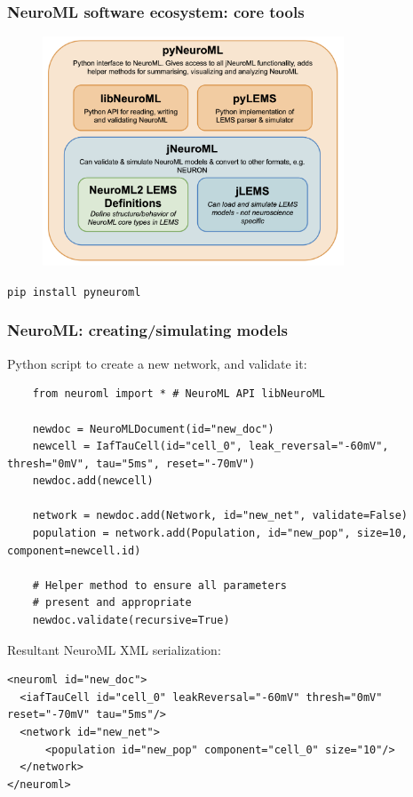 \begin{frame}[c]
  \frametitle{NeuroML software ecosystem: core tools}
  \begin{figure}[h]
    \centering
    \includegraphics[width=0.8\textwidth]{99_images/software.png}
  \end{figure}
  \begin{center}
    \texttt{pip install pyneuroml}
  \end{center}
\end{frame}
\begin{frame}[fragile,c]
  \frametitle{NeuroML: creating/simulating models}
  Python script to create a new network, and validate it:
    \begin{verbatim}
    from neuroml import * # NeuroML API libNeuroML

    newdoc = NeuroMLDocument(id="new_doc")
    newcell = IafTauCell(id="cell_0", leak_reversal="-60mV", thresh="0mV", tau="5ms", reset="-70mV")
    newdoc.add(newcell)

    network = newdoc.add(Network, id="new_net", validate=False)
    population = network.add(Population, id="new_pop", size=10, component=newcell.id)

    # Helper method to ensure all parameters
    # present and appropriate
    newdoc.validate(recursive=True)
    \end{verbatim}
    Resultant NeuroML XML serialization:
    \begin{verbatim}
<neuroml id="new_doc">
  <iafTauCell id="cell_0" leakReversal="-60mV" thresh="0mV" reset="-70mV" tau="5ms"/>
  <network id="new_net">
      <population id="new_pop" component="cell_0" size="10"/>
  </network>
</neuroml>
    \end{verbatim}
\end{frame}
